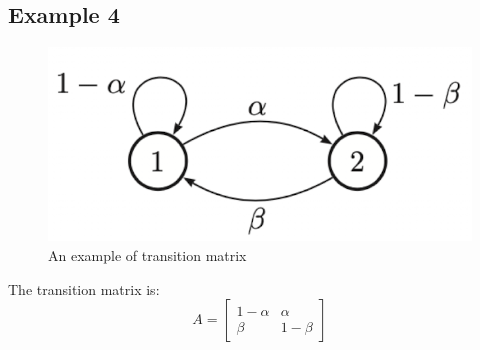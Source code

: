 \subsection{Example 4}
\begin{figure}[H]
    \centering
    \includegraphics[width = .4\linewidth]{codes/figures/appendix/appendix_1.png}
    \caption{An example of transition matrix}
    \label{fig:transition-example}
\end{figure}
The transition matrix is:
$$
A=\left[\begin{array}{cc}
1-\alpha & \alpha \\
\beta & 1-\beta
\end{array}\right]
$$

